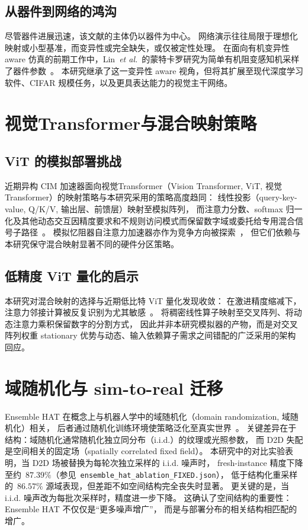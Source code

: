 \subsection{从器件到网络的鸿沟}

尽管器件进展迅速，该文献的主体仍以器件为中心。
网络演示往往局限于理想化映射或小型基准，而变异性或完全缺失，或仅被定性处理。
在面向有机变异性 aware 仿真的前期工作中，Lin~\emph{et al.}~的蒙特卡罗研究为简单有机阻变感知机采样了器件参数~\parencite{lin2016physical}。
本研究继承了这一变异性 aware 视角，但将其扩展至现代深度学习软件、CIFAR 规模任务，以及更具表达能力的视觉主干网络。

\section{视觉Transformer与混合映射策略}

\subsection{ViT 的模拟部署挑战}

近期异构 CIM 加速器面向视觉Transformer（Vision Transformer, ViT, 视觉Transformer）的映射策略与本研究采用的策略高度趋同：
线性投影（query-key-value, Q/K/V, 输出层、前馈层）映射至模拟阵列，
而注意力分数、softmax 归一化及其他动态交互因精度要求和不规则访问模式而保留数字域或委托给专用混合信号子路径~\parencite{kim2025hemlet,lin2024hardsea}。
模拟忆阻器自注意力加速器亦作为竞争方向被探索~\parencite{bettayeb2024memristorattention,qiu2025m3dattention,mia2026trilinear}，
但它们依赖与本研究保守混合映射显著不同的硬件分区策略。

\subsection{低精度 ViT 量化的启示}

本研究对混合映射的选择与近期低比特 ViT 量化发现收敛：
在激进精度缩减下，注意力邻接计算被反复识别为尤其敏感~\parencite{liu2021ptqvit,li2022qvit,lin2023vitptq}。
将稠密线性算子映射至交叉阵列、将动态注意力乘积保留数字的分割方式，
因此并非本研究模拟器的产物，而是对交叉阵列权重 stationary 优势与动态、输入依赖算子需求之间错配的广泛采用的架构回应。

\section{域随机化与 sim-to-real 迁移}

Ensemble HAT 在概念上与机器人学中的域随机化（domain randomization, 域随机化）相关，
后者通过随机化训练环境使策略泛化至真实世界~\parencite{tobin2017domain}。
关键差异在于结构：域随机化通常随机化独立同分布（i.i.d.）的纹理或光照参数，
而 D2D 失配是空间相关的固定场（spatially correlated fixed field）。
本研究中的对比实验表明，当 D2D 场被替换为每轮次独立采样的 i.i.d. 噪声时，
fresh-instance 精度下降至约~$87.39\%$（参见~\texttt{ensemble\_hat\_ablation\_FIXED.json}），
低于结构化重采样的~$86.57\%$ 源域表现，但差距不如空间结构完全丧失时显著。
更关键的是，当 i.i.d. 噪声改为每批次采样时，精度进一步下降。
这确认了空间结构的重要性：Ensemble HAT 不仅仅是``更多噪声增广''，
而是与部署分布的相关结构相匹配的增广。

